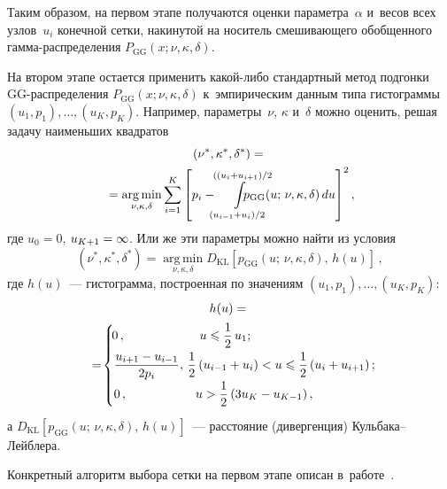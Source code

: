 \begin{multicols}{2}
Таким образом, на первом этапе получаются оценки параметра~$\alpha$
и~весов всех узлов~$u_i$ конечной сетки, накинутой на носитель
смешивающего обобщенного гам\-ма-рас\-пре\-де\-ле\-ния
$P_{\mathrm{GG}}(x;\nu,\kappa,\delta)$.

На втором этапе остается применить ка\-кой-ли\-бо стандартный метод
подгонки GG-рас\-пре\-де\-ле\-ния $P_{\mathrm{GG}}(x;\nu,\kappa,\delta)$ 
к~эмпирическим данным типа гистограммы $(u_1, p_1),\ldots, (u_K, p_K)$. 
Например, параметры~$\nu$, $\kappa$ и~$\delta$ можно оценить,
решая задачу наименьших квадратов
\begin{multline*}
\left(\nu^*,\kappa^*,\delta^*\right)={}\\
{}=
\mathop{\mathrm{arg\,min}}\limits_{\nu,\kappa,\delta}
\sum\limits_{i=1}^K\left[p_i-\hspace*{-2mm}
\int\limits_{(u_{i-1}+u_i)/2}^{((u_i+u_{i+1})/2}\hspace*{-8mm}p_{\mathrm{GG}}
(u;\,\nu,\kappa,\delta)\,du\right]^2,
\end{multline*}
где $u_0=0$, $u_{K+1}\hm=\infty$. Или же эти параметры можно найти из
условия
$$
(\nu^*,\kappa^*,\delta^*)=\mathop{\mathrm{arg\,min}}\limits_{\nu,\kappa,\delta}D_{\mathrm{KL}}
\left[p_{\mathrm{GG}}(u;\,\nu,\kappa,\delta),\,h(u)\right]\,,
$$
где $h(u)$~--- гистограмма, построенная по значениям $(u_1, p_1),\ldots, (u_K,
p_K)$:
\begin{multline*}
h(u)={}\\
\!\!{}=\!\begin{cases}\!
0\,, &\  u\leqslant\fr{1}{2}\,u_1;\\
\fr{u_{i+1}-u_{i-1}}{2p_i}, &\!\!\! \!\fr{1}{2}\left(u_{i-1}+u_i\right)<
u\leqslant\fr{1}{2}\left(u_{i}+u_{i+1}\right);\hspace*{-6.32454pt}\\ 
0\,, & u>\fr{1}{2}\left(3u_{K}-u_{K-1}\right),
\end{cases}\!
\end{multline*}
 а $D_{\mathrm{KL}}\left[p_{\mathrm{GG}}(u;\,\nu,\kappa,\delta),\,h(u)\right]$~---
расстояние (дивергенция) Куль\-ба\-ка--Лейб\-лера.

Конкретный алгоритм выбора сетки на первом этапе описан в~работе~\cite{kk2014}.

\begin{figure*} %
 \vspace*{1pt}
 \begin{center}
 \mbox{%
 \epsfxsize=162.687mm
 }
 \end{center}
 \vspace*{-11pt}
\label{Shanghai_1}
\end{figure*}


\end{multicols}
